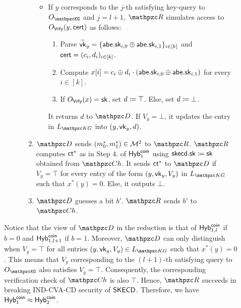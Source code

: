 \begin{description}
\begin{description}
\begin{enumerate}
\begin{itemize}
\item If $y$ corresponds to the $j$-th satisfying key-query to
$\Oracle{\qKG}$ and $j = l+1$, $\qR$ simulates access to
$O_{\mathtt{\mathsf{Vrfy}}}(y,\mathsf{cert})$ as follows:

\begin{enumerate}
    \item Parse $\widetilde{\mathsf{vk}}_{y} = \{\mathsf{abe}.\mathsf{sk}_{i,0}\oplus
\mathsf{abe}.\mathsf{sk}_{i,1}\}_{i\in[k]}$ and $\mathsf{cert}=(c_i,d_i)_{i \in [k]}$.
\item Compute $x[i] = c_i \oplus d_i\cdot(\mathsf{abe}.\mathsf{sk}_{i,0} \oplus
\mathsf{abe}.\mathsf{sk}_{i,1})$ for every $i \in [k]$.
\item If $O_{\mathtt{\mathsf{Vrfy}}}(x) = \mathsf{sk}$, set $d \coloneqq \top$. Else,
      set $d \coloneqq \bot$.
\end{enumerate}

It returns $d$ to $\qD$. If $V_{y} = \bot$, it updates the entry in
$L_{\qKG}$ into $(y, \mathsf{vk}_y, d)$.
\end{itemize}

\item $\qD$ sends $(m_0^*, m_1^*) \in \mathcal{M}^2$ to $\qR$. $\qR$ 
computes $\mathsf{ct}^*$ as in Step $4.$ of $\mathsf{Hyb}_1^{\mathsf{coin}}$ using
$\mathsf{skecd}.\mathsf{sk} \coloneqq \mathsf{sk}$ obtained from $\qCh$. It sends $\mathsf{ct}^*$ to
$\qD$ if $V_y = \top$ for every entry of the form $(y, \mathsf{vk}_y, V_y)$ in
$L_{\qKG}$ such that $x^*(y) = 0$. Else, it outputs $\bot$.
\item $\qD$ guesses a bit $b'$. $\qR$ sends $b'$ to $\qCh$.
\end{enumerate}
\end{description}
Notice that the view of $\qD$ in the reduction is that of
$\mathsf{Hyb}_{1,l}^{\mathsf{coin}}$ if $b=0$ and $\mathsf{Hyb}_{1,l+1}^{\mathsf{coin}}$ if $b=1$.
Moreover, $\qD$ can only distinguish when $V_y = \top$ for all entries
$(y, \vk_y, V_y) \in L_{\qKG}$ such that $x^*(y) = 0$.
This means that $V_{y}$ corresponding to the $(l+1)$-th satisfying
query to $\Oracle{\qKG}$ also
satisfies $V_y = \top$. Consequently, the
corresponding verification check of $\qCh$ is also $\top$. Hence, $\qR$ succeeds
in breaking IND-CVA-CD security of $\mathsf{SKECD}$. Therefore, we have
$\mathsf{Hyb}_1^{\mathsf{coin}} \approx \mathsf{Hyb}_2^{\mathsf{coin}}$.
\end{description}

